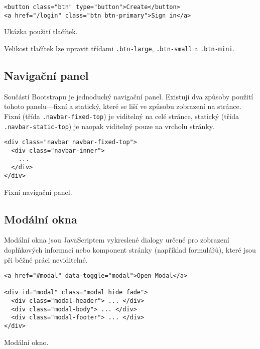 \begin{example}
    \centering
    \begin{lstlisting}
<button class="btn" type="button">Create</button>
<a href="/login" class="btn btn-primary">Sign in</a>
    \end{lstlisting}
    \caption{Ukázka použití tlačítek.}
    \label{example:form}
\end{example}

Velikost tlačítek lze upravit třídami \texttt{.btn-large}, \texttt{.btn-small} a \texttt{.btn-mini}.

\subsection{Navigační panel}

Součástí Bootstrapu je jednoduchý navigační panel. Existují dva způsoby použití tohoto panelu---fixní a statický, které se liší ve způsobu zobrazení na stránce. Fixní (třída \texttt{.navbar-fixed-top}) je viditelný na celé stránce, statický (třída \texttt{.navbar-static-top}) je naopak viditelný pouze na vrcholu stránky.

\begin{example}
    \centering
    \begin{lstlisting}
<div class="navbar navbar-fixed-top">
  <div class="navbar-inner">
    ...
  </div>
</div>
    \end{lstlisting}
    \caption{Fixní navigační panel.}
    \label{example:form}
\end{example}

\subsection{Modální okna}

Modální okna jsou JavaScriptem vykreslené dialogy určené pro zobrazení doplňkových informací nebo komponent stránky (například formulářů), které jsou při běžné práci neviditelné.

\begin{example}
    \centering
    \begin{lstlisting}
<a href="#modal" data-toggle="modal">Open Modal</a>

<div id="modal" class="modal hide fade">
  <div class="modal-header"> ... </div>
  <div class="modal-body"> ... </div>
  <div class="modal-footer"> ... </div>
</div>
    \end{lstlisting}
    \caption{Modální okno.}
    \label{example:form}
\end{example}
